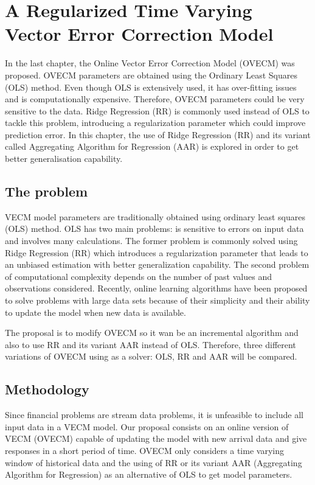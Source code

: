 \chapter{A Regularized Time Varying Vector Error Correction Model}

In the last chapter, the Online Vector Error Correction Model (OVECM) was
proposed. OVECM parameters are obtained using the Ordinary Least Squares (OLS)
method. Even though OLS is extensively used, it has over-fitting issues and is
computationally expensive. Therefore, OVECM parameters could be very sensitive
to the data. Ridge Regression (RR) is commonly used instead of OLS to tackle
this problem, introducing a regularization parameter which could improve
prediction error.  In this chapter, the use of Ridge Regression (RR) and its
variant called Aggregating Algorithm for Regression (AAR) is explored in order
to get better generalisation capability. 

\section{The problem}

VECM model parameters are traditionally obtained using ordinary least squares
(OLS) method. OLS has two main problems: is sensitive to errors on input data
and involves many calculations. The former problem is commonly solved using
Ridge Regression (RR) \cite{hoerl1970} which introduces a regularization
parameter that leads to an unbiased estimation with better generalization
capability. The second problem of computational complexity depends on the number
of past values and observations considered.  Recently, online learning
algorithms have been proposed to solve problems with large data sets because of
their simplicity and their ability to update the model when new data is
available. 

The proposal is to modify OVECM so it wan be an incremental algorithm and also
to use RR and its variant AAR instead of OLS. Therefore, three different
variations of OVECM using as a solver: OLS, RR and AAR will be compared. 


\section{Methodology}

Since financial problems are stream data problems, it is unfeasible to include
all input data in a VECM model. Our proposal consists on an online version of
VECM (OVECM) capable of updating the model with new arrival data and give
responses in a short period of time. OVECM only considers a time varying window
of historical data and the using of RR or its variant AAR (Aggregating Algorithm
for Regression) as an alternative of OLS to get model parameters.

